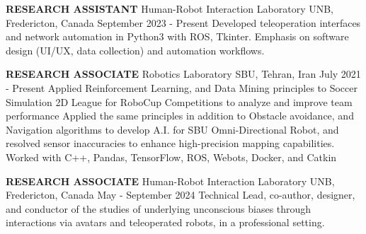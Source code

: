 
\begin{cventries}
    \cventry
    {\textbf{RESEARCH ASSISTANT}}
    {Human-Robot Interaction Laboratory}
    {UNB, Fredericton, Canada}
    {September 2023 - Present}
    {
        Developed teleoperation interfaces and network automation in Python3 with ROS, Tkinter.
        \newline Emphasis on software design (UI/UX, data collection) and automation workflows.
    }
    \vspace{0.4 cm}
\end{cventries}



\begin{cventries}
    \cventry
    {\textbf {RESEARCH ASSOCIATE}}
    {Robotics Laboratory}
    {SBU, Tehran, Iran}
    {July 2021 - Present}
    {
        Applied Reinforcement Learning, and Data Mining principles to Soccer Simulation 2D League for RoboCup Competitions to analyze and improve team performance 
        \newline Applied the same principles in addition to Obstacle avoidance, and Navigation algorithms to develop A.I. for SBU Omni-Directional Robot, 
        and resolved sensor inaccuracies to enhance high-precision mapping capabilities.
        \newline Worked with C++, Pandas, TensorFlow, ROS, Webots, Docker, and Catkin
    }
    \vspace{0.4 cm}
\end{cventries}

\begin{cventries}
    \cventry
    {\textbf{RESEARCH ASSOCIATE}}
    {Human-Robot Interaction Laboratory}
    {UNB, Fredericton, Canada}
    {May - September 2024}
    {
        Technical Lead, co-author, designer, and conductor of the studies of underlying unconscious biases through interactions via avatars and teleoperated robots, in a professional setting.
    }
    \vspace{0.4 cm}
\end{cventries}


